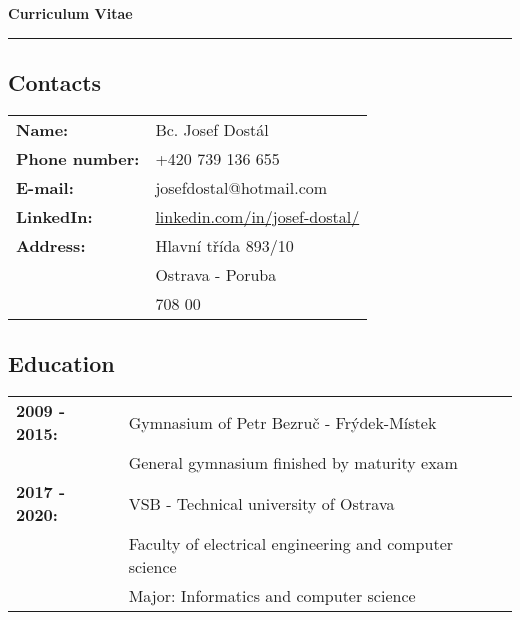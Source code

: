 \documentclass[a4paper]{article}
\begin{document}
\begin{center}
    \huge{\textbf{Curriculum Vitae}}
    \par\noindent\rule{\textwidth}{0.4pt}
\end{center}

\subsection*{Contacts}
\begin{tabular}{>{\bfseries}l l}
    Name:            & Bc. Josef Dostál \\
    Phone number:    & +420 739 136 655 \\
    E-mail:          & josefdostal@hotmail.com \\
    LinkedIn:        & \href {https://www.linkedin.com/in/josef-dostal/}
                             {linkedin.com/in/josef-dostal/} \\
    Address:         & Hlavní třída 893/10 \\
                     & Ostrava - Poruba \\
                     & 708 00
\end{tabular}

\subsection*{Education}
\begin{tabular}{>{\bfseries}l l}
    2009 - 2015: & Gymnasium of Petr Bezruč - Frýdek-Místek \\
                 & General gymnasium finished by maturity exam \\
    2017 - 2020: & VSB - Technical university of Ostrava \\
                 & Faculty of electrical engineering and computer science \\
                 & Major: Informatics and computer science \\
\end{tabular}
\end{document}
